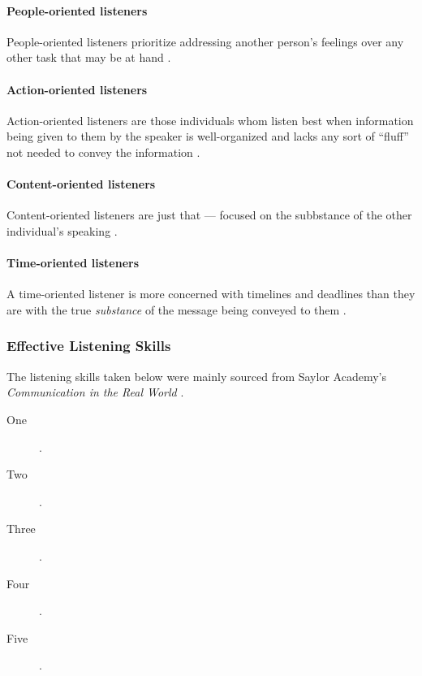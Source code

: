 \documentclass[stu,12pt]{apa7}
\begin{document}
        \paragraph{People-oriented listeners}
          People-oriented listeners prioritize addressing another person's
            feelings over any other task that may be at hand
            \parencite[pp. 338]{noauthor_communication_2013}.

        \paragraph{Action-oriented listeners}
          Action-oriented listeners are those individuals whom listen best when
            information being given to them by the speaker is well-organized
            and lacks any sort of ``fluff'' not needed to convey the information
            \parencite[pp. 338--339]{noauthor_communication_2013}.

        \paragraph{Content-oriented listeners}
          Content-oriented listeners are just that --- focused on the subbstance
            of the other individual's speaking
            \parencite[pp. 339]{noauthor_communication_2013}.

        \paragraph{Time-oriented listeners}
          A time-oriented listener is more concerned with timelines and
            deadlines than they are with the true \textit{substance} of the
            message being conveyed to them
            \parencite[pp. 339--340]{noauthor_communication_2013}.


      \subsubsection{Effective Listening Skills}
        The listening skills taken below were mainly sourced from Saylor
          Academy's \textit{Communication in the Real World}
          \parencite[pp. 330--345]{noauthor_communication_2013}.

          \begin{description}
            \item[One]
              \parencite[pp. ]{noauthor_communication_2013}.
            \item[Two]
              \parencite[pp. ]{noauthor_communication_2013}.
            \item[Three]
              \parencite[pp. ]{noauthor_communication_2013}.
            \item[Four]
              \parencite[pp. ]{noauthor_communication_2013}.
            \item[Five]
              \parencite[pp. ]{noauthor_communication_2013}.
          \end{description}
\end{document}
